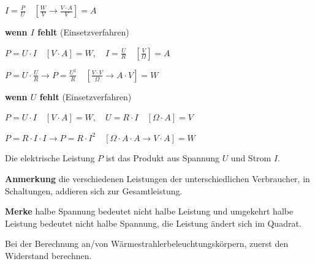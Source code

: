 $\boxed{I = \frac{P}{U}} \quad [\frac{W}{V} \to \frac{V \cdot A}{V}] = A$

\textbf{wenn $I$ fehlt} (Einsetzverfahren)

$P = U \cdot I \quad [V \cdot A] = W, \quad I = \frac{U}{R} \quad [\frac{V}{\Omega}] = A$

$P = U \cdot \frac{U}{R} \to \boxed{P = \frac{U^2}{R}} \quad [\frac{V \cdot V}{\Omega} \to A \cdot V] = W$

\textbf{wenn $U$ fehlt} (Einsetzverfahren)

$P = U \cdot I \quad [V \cdot A] = W, \quad U = R \cdot I \quad [\Omega \cdot A] = V$

$P = R \cdot I \cdot I \to \boxed{P = R \cdot I^2} \quad [\Omega \cdot A \cdot A \to V \cdot A] = W$

Die elektrische Leistung $P$ ist das Produkt aus Spannung $U$ und
Strom $I$.

\textbf{Anmerkung} die verschiedenen Leistungen der unterschiedlichen
Verbraucher, in Schaltungen, addieren sich zur Gesamtleistung.

\textbf{Merke} halbe Spannung bedeutet nicht halbe Leistung und
umgekehrt halbe Leistung bedeutet nicht halbe Spannung, die Leistung
ändert sich im Quadrat.

Bei der Berechnung an/von Wärmestrahlerbeleuchtungskörpern, zuerst den
Widerstand berechnen.

